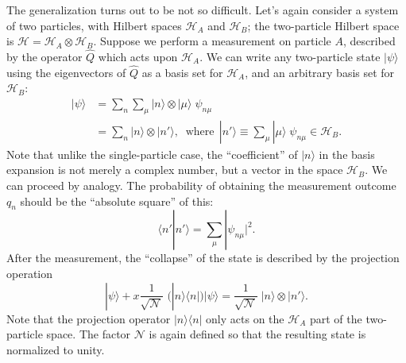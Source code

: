 \documentclass[pra,11pt]{revtex4}
\begin{document}
The generalization turns out to be not so difficult.  Let's again
consider a system of two particles, with Hilbert spaces
$\mathscr{H}_A$ and $\mathscr{H}_B$; the two-particle Hilbert space is
$\mathscr{H} = \mathscr{H}_A \otimes \mathscr{H}_B$.  Suppose we
perform a measurement on particle $A$, described by the operator
$\hat{Q}$ which acts upon $\mathscr{H}_A$.  We can write any two-particle
state $|\psi\rangle$ using the eigenvectors of $\hat{Q}$ as a basis
set for $\mathscr{H}_A$, and an arbitrary basis set for
$\mathscr{H}_B$:
$$\begin{aligned}|\psi\rangle &= \sum_{n}\sum_{\mu} |n\rangle\otimes |\mu\rangle \;\psi_{n\mu} \\&= \sum_n |n\rangle\otimes |n'\rangle, \;\;\mathrm{where}\;\,|n'\rangle\equiv \sum_\mu |\mu\rangle \;\psi_{n\mu} \in \mathscr{H}_B.\end{aligned}$$
Note that unlike the single-particle case, the ``coefficient'' of
$|n\rangle$ in the basis expansion is not merely a complex number, but
a vector in the space $\mathscr{H}_B$.  We can proceed by
analogy.  The probability of obtaining the measurement outcome $q_n$
should be the ``absolute square'' of this:
$$\langle n'|n'\rangle = \sum_\mu |\psi_{n\mu}|^2.$$
After the measurement, the ``collapse'' of the state is described by
the projection operation
$$|\psi\rangle +\!x \frac{1}{\sqrt{\mathcal{N}}}\; \Big(|n\rangle\langle n|\Big) |\psi\rangle = \frac{1}{\sqrt{\mathcal{N}}}\; |n\rangle\otimes |n'\rangle.$$
Note that the projection operator $|n\rangle\langle n|$ only acts on
the $\mathscr{H}_A$ part of the two-particle space.  The factor
$\mathcal{N}$ is again defined so that the resulting state is
normalized to unity.
\end{document}
